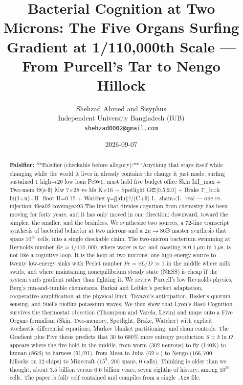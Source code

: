 \documentclass[11pt,a4paper]{article}
\title{Bacterial Cognition at Two Microns: The Five Organs Surfing Gradient at 1/110,000th Scale --- From Purcell's Tar to Nengo Hillock}
\author{Shehzad Ahmed and Sisyphus \\ Independent University Bangladesh (IUB) \\ \texttt{shehzad0002@gmail.com}}
\date{2026-09-07}
\begin{document}
\maketitle

\begin{abstract}
\noindent\textbf{Falsifier:} **Falsifier (checkable before allegory):** `Anything that stays itself while changing while the world it lives in already contains the change it just made, surfing sustained 1 high→20 low loan Pe≫1, must hold five budget office Skin I≤I_max + Two-mem Θ(ε-θ) Mw 7×28 vs Ms K×16 + Spotlight G∈[0.5,2.0] + Brake Γ_b=k ln(1+n)+H_floor H=0.15 + Watcher γ=∫||dμ||²/(C+δ) L_sham<L_real — one re-injection 49ea02 coverage≥95%
The line that divides cognition from chemistry has been moving for forty years, and it has only moved in one direction: downward, toward the simpler, the smaller, and the brainless. We synthesize two sources, a 72-line transcript synthesis of bacterial behavior at two microns and a $2\mu \to 86$B master synthesis that spans $10^{30}$ cells, into a single checkable claim. The two-micron bacterium swimming at Reynolds number $Re \approx 1/110{,}000$, where water is tar and coasting is $0.1\,\mu$m in $1\,\mu$s, is not like a cognitive loop. It is the loop at two microns: one high-energy source to twenty low-energy sinks with Peclet number $Pe = vL/D \gg 1$ in the middle where milk swirls, and where maintaining nonequilibrium steady state (NESS) is cheap if the system surfs gradient rather than fighting it. We review Purcell's low Reynolds physics, Berg's run-and-tumble chemotaxis, Barkai and Leibler's perfect adaptation, cooperative amplification at the physical limit, Tavazoi's anticipation, Basler's quorum sensing, and Suel's biofilm potassium waves. We then show that Lyon's Basil Cognition survives the thermostat objection (Thompson and Varela, Levin) and maps onto a Five Organs formalism (Skin, Two-memory, Spotlight, Brake, Watcher) with explicit stochastic differential equations, Markov blanket partitioning, and sham controls. The Gradient plus Five thesis predicts that $30$ to $680\%$ more entropy production $S = k \ln \Omega$ appears where the five hold in the middle, from worm (302 neurons) to fly (140K) to human (86B) to harness (91/91), from Mesa to Julia ($62\times$) to Nengo ($166{,}700$ hillocks on 12 chips) to Minecraft ($15^3$, 200 spans, 0 calls). Thinking is older than we thought, about $3.5$ billion versus $0.6$ billion years, seven eighths of history, among $10^{30}$ cells. The paper is fully self contained and compiles from a single \texttt{.tex} file.
\end{abstract}
\end{document}
